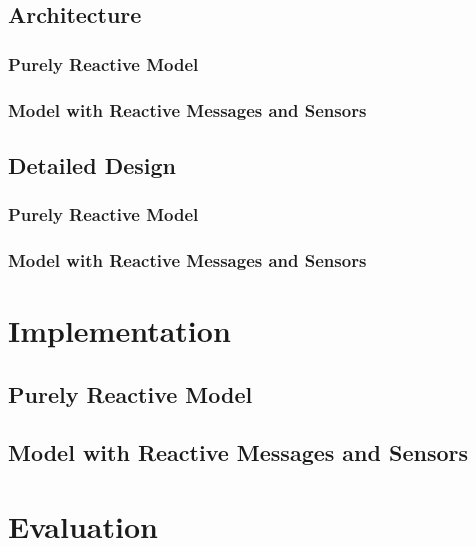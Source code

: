 \documentclass[12pt,a4paper,openright,twoside]{book}
\begin{document}
\section{Architecture}

\subsection{Purely Reactive Model}

\subsection{Model with Reactive Messages and Sensors}

\section{Detailed Design}

\subsection{Purely Reactive Model}

\subsection{Model with Reactive Messages and Sensors}

\chapter{Implementation}
\label{chap:implementation}

\section{Purely Reactive Model}

\section{Model with Reactive Messages and Sensors}

\chapter{Evaluation}
\label{chap:evaluation}
\end{document}
